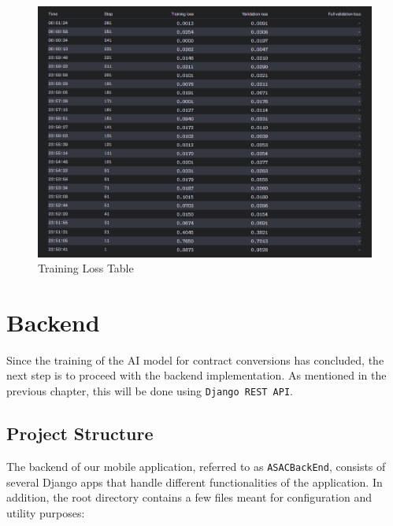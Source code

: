 \begin{figure}[!ht]
    \centering
    \includegraphics[width=1\textwidth]{LATEX/Appendices/Images/Software/AI Model/training_validation_loss_table.png}
    \caption{Training Loss Table}
    \label{fig:training_loss_table}
\end{figure}

\section{Backend}

Since the training of the AI model for contract conversions has concluded, the next step is to proceed with the backend implementation. As mentioned in the previous chapter, this will be done using \texttt{Django REST API}. 

\subsection{Project Structure}

The backend of our mobile application, referred to as \texttt{ASACBackEnd}, consists of several Django apps that handle different functionalities of the application. In addition, the root directory contains a few files meant for  configuration and utility purposes:

